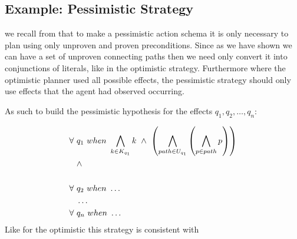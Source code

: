 \documentclass[\master/Master.tex]{subfiles}
\begin{document}
  	
  	
  	\subsection{Example: Pessimistic Strategy}
  	
  we recall from  that to make a pessimistic action schema it is only necessary to plan using only unproven and proven preconditions. Since as we have shown we can have a set of unproven connecting paths then we need only convert it into conjunctions of literals, like in the optimistic strategy. Furthermore where the optimistic planner used all possible effects, the pessimistic strategy should only use effects that the agent had observed occurring.
  
  As such to build the pessimistic hypothesis for the effects $q_1,q_2,\dots,q_n$:  	
  
  \begin{equation} \label{eq:ca:pes-preconds}
  \begin{split}  	
  \forall ~& q_1 ~ when ~ \bigwedge\limits_{k \in K_{q_1}} k ~ \land ~
  \left( \bigwedge \limits_{path \in U_{q_1}} \left( \bigwedge \limits_{p \in path} p\right)\right)
  \\
  & \land \\
  \\
  \forall ~& q_2 ~ when ~  \dots \\
  &\dots \\
  \forall ~& q_n ~ when ~  \dots
  \end{split}  	
  \end{equation}
  Like for the optimistic this strategy is consistent with 
  	
    
\end{document}

